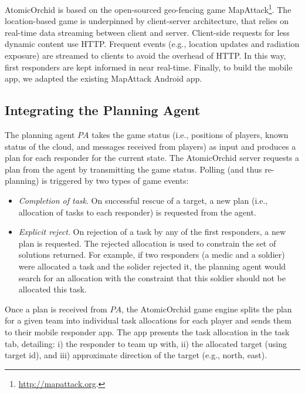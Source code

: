 \noindent AtomicOrchid is based on the open-sourced geo-fencing game MapAttack\footnote{\url{http://mapattack.org}.}. The location-based game is underpinned by client-server architecture, that relies on real-time data streaming between client and server. Client-side requests for less dynamic content use HTTP. Frequent events (e.g., location updates and radiation exposure) are streamed to clients to avoid the overhead of HTTP. In this way, first responders are kept informed in near real-time. Finally,  to build the mobile app, we adapted the existing MapAttack Android app.


\subsection{Integrating the Planning Agent}
\noindent The planning agent $PA$ takes the game status (i.e., positions of players, known status of the cloud, and messages received from players) as input and produces a plan for each responder  for the current state.  The AtomicOrchid server requests a plan from the agent by transmitting the game status. Polling (and thus re-planning) is triggered by two types of game events:
\begin{itemize}
\item \textit{Completion of task}. On successful rescue of a target, a new plan (i.e., allocation of tasks to each responder) is requested from the agent.
\item \textit{Explicit reject}. On rejection of a task by any of the first responders, a new plan is requested. The rejected allocation is used to constrain the set of solutions returned. For example, if two responders (a medic and a soldier) were allocated a task and the solider rejected it, the planning agent would search for an  allocation with the constraint that this soldier should not be allocated this task.
\end{itemize} 

Once a plan is received from $PA$, the AtomicOrchid game engine splits the plan for a given team into individual task allocations for each player and sends them to their mobile responder app. The app presents the task allocation in the task tab, detailing: i) the responder to team up with, ii) the allocated target (using target id), and iii) approximate direction of the target (e.g., north, east).  %


